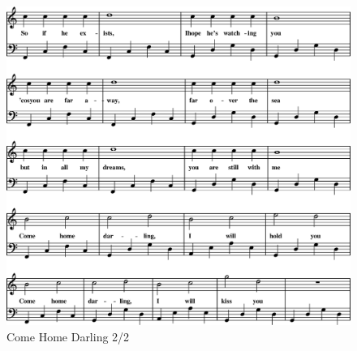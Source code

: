 \begin{figure}[!htbp]
  \includegraphics[width=\textwidth,height=\textheight,keepaspectratio]{../songs/14_come_home_darling-1.png}
  \caption{Come Home Darling 2/2}
  \label{fig:14_come_home_darling_2}
\end{figure}
